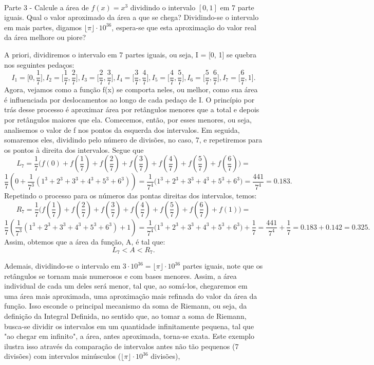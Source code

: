 \documentclass[exercícios_de_cálculo.tex]{subfiles}
\begin{document}
\paragraph{} Parte 3 - Calcule a área de $f(x) = x^3$ dividindo o intervalo $[0, 1]$ em 7 parte iguais. Qual o valor aproximado da área a que se chega? Dividindo-se o intervalo em mais partes, digamos $\lfloor{\pi}\rfloor\cdot{10^{36}}$, espera-se que esta aproximação do valor real da área melhore ou piore?
\begin{sol*}
	A priori, dividiremos o intervalo em 7 partes iguais, ou seja, I = [0, 1] se quebra nos seguintes pedaços:
	$$
		I_1 = \biggl[0, \frac{1}{7}\biggr],     I_2 = \biggl[\frac{1}{7}, \frac{2}{7}\biggr],       I_3 = \biggl[\frac{2}{7}, \frac{3}{7}\biggr],    I_4 = \biggl[\frac{3}{7}, \frac{4}{7}\biggr],    I_5 = \biggl[\frac{4}{7}, \frac{5}{7}\biggr], I_6 = \biggl[\frac{5}{7}, \frac{6}{7}\biggr], I_7 = \biggl[\frac{6}{7}, 1\biggr].
	$$
	Agora, vejamos como a função f(x) se comporta neles, ou melhor, como sua área é influenciada por deslocamentos ao longo de cada pedaço de I. O princípio por trás desse processo é aproximar área por retângulos menores que a total e depois por retângulos maiores que ela. Comecemos, então, por esses menores, ou seja, analisemos o valor de f nos pontos da esquerda dos intervalos. Em seguida, somaremos eles, dividindo pelo número de divisões, no caso, 7, e repetiremos para os pontos à direita dos intervalos. Segue que
	$$
		L_7 = \frac{1}{7}\biggl(f(0) + f(\frac{1}{7}) + f(\frac{2}{7}) + f(\frac{3}{7}) + f(\frac{4}{7}) + f(\frac{5}{7}) + f(\frac{6}{7})\biggr) =
	$$
	$$
		\frac{1}{7}(0 + \frac{1}{7^3}(1^3 + 2^3 + 3^3 + 4^3 + 5^3 + 6^3)) = \frac{1}{7^4}\biggl(1^3 + 2^3 + 3^3 + 4^3 + 5^3 + 6^3\biggr) = \frac{441}{7^4}
		= 0.183.$$
	Repetindo o processo para os números das pontas direitas dos intervalos, temos:
	$$
		R_7 = \frac{1}{7}\biggl(f(\frac{1}{7}) + f(\frac{2}{7}) + f(\frac{3}{7}) + f(\frac{4}{7}) + f(\frac{5}{7}) + f(\frac{6}{7}) + f(1)\biggr) =
	$$
	$$
		\frac{1}{7}(\frac{1}{7^3}(1^3 + 2^3 + 3^3 + 4^3 + 5^3 + 6^3) + 1) = \frac{1}{7^4}\biggl(1^3 + 2^3 + 3^3 + 4^3 + 5^3 + 6^3\biggr) + \frac{1}{7} = \frac{441}{7^4} + \frac{1}{7}= 0.183 + 0.142 = 0.325.
	$$
	Assim, obtemos que a área da função, A, é tal que:
	$$
		L_7 < A < R_7.
	$$
	\par{}Ademais, dividindo-se o intervalo em $3\cdot{10^{36}} = \lfloor{\pi}\rfloor\cdot{10^{36}}$ partes iguais, note que os retângulos se tornam mais numerosos e com bases menores. Assim, a área individual de cada um deles será menor, tal que, ao somá-los, chegaremos em uma área mais aproximada, uma aproximação mais refinada do valor da área da função. Isso esconde o principal mecanismo da soma de Riemann, ou seja, da definiç\~ao da Integral Definida, no sentido que, ao tomar a soma de Riemann, busca-se dividir os intervalos em um quantidade infinitamente pequena, tal que "ao chegar em infinito", a área, antes aproximada, torna-se exata. Este exemplo ilustra isso através da comparaç\~ao de intervalos antes n\~ao t\~ao pequenos (7 divisões) com intervalos minúsculos ($\lfloor{\pi}\rfloor\cdot{10}^{36}$ divisões),
	\qedsymbol
\end{sol*}
\end{document}
